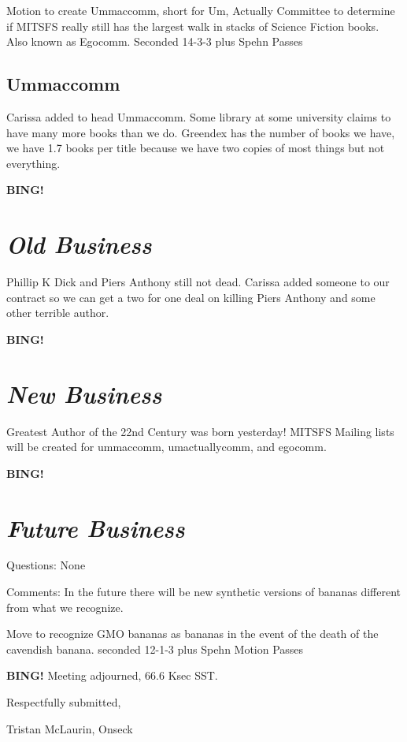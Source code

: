 \documentclass[10pt]{article}
\newcommand{\bing}{{\bf BING!} }
\newcommand{\goto}[1]{\bing \vskip 12pt \section*{{\em{#1}}}}
\newcommand{\ps}{ plus Spehn\xspace}
\newcommand{\onseck}{Tristan McLaurin, Onseck}
\begin{document}
Motion to create Ummaccomm, short for Um, Actually Committee to determine if MITSFS really still has the largest walk in stacks of Science Fiction books. Also known as Egocomm.
Seconded
14-3-3\ps
Passes

\subsection*{Ummaccomm}
Carissa added to head Ummaccomm.
Some library at some university claims to have many more books than we do. Greendex has the number of books we have, we have 1.7 books per title because we have two copies of most things but not everything. 

\goto{Old Business}
Phillip K Dick and Piers Anthony still not dead.
Carissa added someone to our contract so we can get a two for one deal on killing Piers Anthony and some other terrible author.

\goto{New Business}
Greatest Author of the 22nd Century was born yesterday! MITSFS
Mailing lists will be created for ummaccomm, umactuallycomm, and egocomm.


\goto{Future Business}
Questions:
None

Comments:
In the future there will be new synthetic versions of bananas different from what we recognize. 

Move to recognize GMO bananas as bananas in the event of the death of the cavendish banana.
seconded
12-1-3\ps
Motion Passes


\bing
\noindent
Meeting adjourned, 66.6 Ksec SST.

\vspace{18pt}

\centerline{Respectfully submitted,}
\centerline{\onseck}
\end{document}
